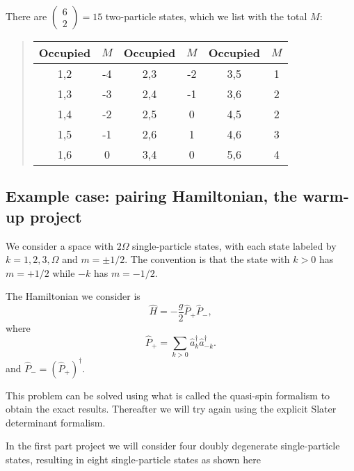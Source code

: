 \documentclass[%
twoside,                 %
final,                   %
10pt]{article}
\begin{document}
\noindent
There are $\left ( \begin{array}{c} 6 \\ 2 \end{array} \right) = 15$ two-particle states, 
which we list with the total $M$:


\begin{quote}
\begin{tabular}{cccccc}
\hline
\multicolumn{1}{c}{ Occupied } & \multicolumn{1}{c}{ $M$ } & \multicolumn{1}{c}{ Occupied } & \multicolumn{1}{c}{ $M$ } & \multicolumn{1}{c}{ Occupied } & \multicolumn{1}{c}{ $M$ } \\
\hline
1,2      & -4  & 2,3      & -2  & 3,5      & 1   \\
1,3      & -3  & 2,4      & -1  & 3,6      & 2   \\
1,4      & -2  & 2,5      & 0   & 4,5      & 2   \\
1,5      & -1  & 2,6      & 1   & 4,6      & 3   \\
1,6      & 0   & 3,4      & 0   & 5,6      & 4   \\
\hline
\end{tabular}
\end{quote}

\noindent




\subsection{Example case: pairing Hamiltonian, the warm-up project}


We consider a space with $2\Omega$ single-particle states, with each 
state labeled by 
$k = 1, 2, 3, \Omega$ and $m = \pm 1/2$. The convention is that 
the state with $k>0$ has $m = + 1/2$ while $-k$ has $m = -1/2$.


The Hamiltonian we consider is 
\[
\hat{H} = -\frac{g}{2} \hat{P}_+ \hat{P}_-,
\]
where
\[
\hat{P}_+ = \sum_{k > 0} \hat{a}^\dagger_k \hat{a}^\dagger_{-{k}}.
\]
and $\hat{P}_- = ( \hat{P}_+)^\dagger$.

This problem can be solved using what is called the quasi-spin formalism to obtain the 
exact results. Thereafter we will try again using the explicit Slater determinant formalism.


In the first part project we will consider four doubly degenerate single-particle states, resulting in eight single-particle states as shown here
\end{document}
